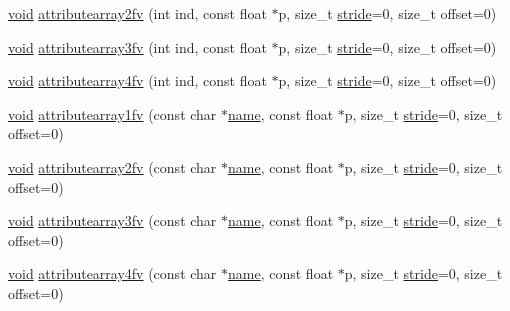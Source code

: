 \begin{DoxyCompactItemize}
\item 
\hyperlink{namespacetrimesh_a784ddfd979e1c579bda795a8edfc3f43}{void} \hyperlink{classtrimesh_1_1GLManager_a236a8bb1c11872ff60245ed08713dc99}{attributearray2fv} (int ind, const float $\ast$p, size\+\_\+t \hyperlink{namespacetrimesh_adbcc86014e77656be1a9df7ecaae5f2f}{stride}=0, size\+\_\+t offset=0)
\item 
\hyperlink{namespacetrimesh_a784ddfd979e1c579bda795a8edfc3f43}{void} \hyperlink{classtrimesh_1_1GLManager_a9acabddda9e00d3fb4d4725a7f6ac1a5}{attributearray3fv} (int ind, const float $\ast$p, size\+\_\+t \hyperlink{namespacetrimesh_adbcc86014e77656be1a9df7ecaae5f2f}{stride}=0, size\+\_\+t offset=0)
\item 
\hyperlink{namespacetrimesh_a784ddfd979e1c579bda795a8edfc3f43}{void} \hyperlink{classtrimesh_1_1GLManager_a97cdf66eccf0f2b2d9103887ddb54ead}{attributearray4fv} (int ind, const float $\ast$p, size\+\_\+t \hyperlink{namespacetrimesh_adbcc86014e77656be1a9df7ecaae5f2f}{stride}=0, size\+\_\+t offset=0)
\item 
\hyperlink{namespacetrimesh_a784ddfd979e1c579bda795a8edfc3f43}{void} \hyperlink{classtrimesh_1_1GLManager_ae49a795bd7b858d3244973f361789757}{attributearray1fv} (const char $\ast$\hyperlink{namespacetrimesh_a7f24cdcfa73387d7fa6aa44676238a79}{name}, const float $\ast$p, size\+\_\+t \hyperlink{namespacetrimesh_adbcc86014e77656be1a9df7ecaae5f2f}{stride}=0, size\+\_\+t offset=0)
\item 
\hyperlink{namespacetrimesh_a784ddfd979e1c579bda795a8edfc3f43}{void} \hyperlink{classtrimesh_1_1GLManager_a08b8a9cb14528ea00466259eb84e0595}{attributearray2fv} (const char $\ast$\hyperlink{namespacetrimesh_a7f24cdcfa73387d7fa6aa44676238a79}{name}, const float $\ast$p, size\+\_\+t \hyperlink{namespacetrimesh_adbcc86014e77656be1a9df7ecaae5f2f}{stride}=0, size\+\_\+t offset=0)
\item 
\hyperlink{namespacetrimesh_a784ddfd979e1c579bda795a8edfc3f43}{void} \hyperlink{classtrimesh_1_1GLManager_aed6a872172e4440b7538d81ce0cab52d}{attributearray3fv} (const char $\ast$\hyperlink{namespacetrimesh_a7f24cdcfa73387d7fa6aa44676238a79}{name}, const float $\ast$p, size\+\_\+t \hyperlink{namespacetrimesh_adbcc86014e77656be1a9df7ecaae5f2f}{stride}=0, size\+\_\+t offset=0)
\item 
\hyperlink{namespacetrimesh_a784ddfd979e1c579bda795a8edfc3f43}{void} \hyperlink{classtrimesh_1_1GLManager_ada8d618ad41ccbc60c45764826639ba3}{attributearray4fv} (const char $\ast$\hyperlink{namespacetrimesh_a7f24cdcfa73387d7fa6aa44676238a79}{name}, const float $\ast$p, size\+\_\+t \hyperlink{namespacetrimesh_adbcc86014e77656be1a9df7ecaae5f2f}{stride}=0, size\+\_\+t offset=0)

\end{DoxyCompactItemize}
